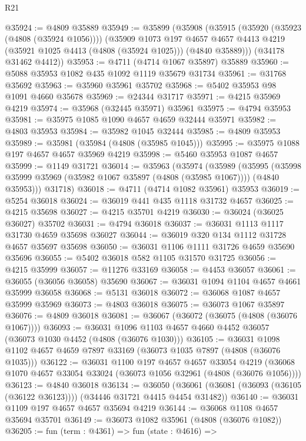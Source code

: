 \begin{lexlean}{R21}
\begin{coremodule}
@35924 := @4809 @35889
@35949 := @35899
    (@35908
      (@35915
        (@35920 (@35923 (@4808 (@35924 @1056))))
        (@35909
          @1073
          @197
          @4657
          @4657
          @4413
          @4219
          (@35921 @1025 @4413 (@4808 (@35924 @1025)))
          (@4840 @35889)))
      (@34178 @31462 @4412))
@35953 := @4711 (@4714 @1067 @35897) @35889
@35960 := @5088 @35953 @1082 @435 @1092 @1119 @35679 @31734
@35961 := @31768 @35692
@35963 := @35960 @35961 @35702
@35968 := @5402 @35953 @98 @1091 @4660 @35678
@35969 := @24344 @31717
@35971 := @4215 @35969 @4219
@35974 := @35968 (@32445 @35971) @35961
@35975 := @4794 @35953
@35981 := @35975 @1085 @1090 @4657 @4659 @32444 @35971
@35982 := @4803 @35953
@35984 := @35982 @1045 @32444
@35985 := @4809 @35953
@35989 := @35981 (@35984 (@4808 (@35985 @1045)))
@35995 := @35975 @1088 @197 @4657 @4657 @35969 @4219
@35998 := @5460 @35953 @1087 @4657
@35999 := @1149 @31721
@36014 := @35963
    (@35974
      (@35989
        (@35995 (@35998 @35999 @35969 (@35982 @1067 @35897 (@4808 (@35985 @1067)))) (@4840 @35953)))
      @31718)
@36018 := @4711 (@4714 @1082 @35961) @35953
@36019 := @5254 @36018
@36024 := @36019 @441 @435 @1118 @31732 @4657
@36025 := @4215 @35698
@36027 := @4215 @35701 @4219
@36030 := @36024 (@36025 @36027) @35702
@36031 := @4794 @36018
@36037 := @36031 @1113 @1117 @31730 @4659 @35698 @36027
@36044 := @36019 @320 @134 @1112 @31728 @4657 @35697 @35698
@36050 := @36031 @1106 @1111 @31726 @4659 @35690 @35696
@36055 := @5402 @36018 @582 @1105 @31570 @31725
@36056 := @4215 @35999
@36057 := @11276 @33169
@36058 := @4453 @36057
@36061 := @36055 (@36056 @36058) @35690
@36067 := @36031 @1094 @1104 @4657 @4661 @35999 @36058
@36068 := @5131 @36018
@36072 := @36068 @1087 @4657 @35999 @35969
@36073 := @4803 @36018
@36075 := @36073 @1067 @35897
@36076 := @4809 @36018
@36081 := @36067 (@36072 (@36075 (@4808 (@36076 @1067))))
@36093 := @36031 @1096 @1103 @4657 @4660 @4452 @36057 (@36073 @1030 @4452 (@4808 (@36076 @1030)))
@36105 := @36031 @1098 @1102 @4657 @4659 @7897 @33169 (@36073 @1035 @7897 (@4808 (@36076 @1035)))
@36122 := @36031
    @1100
    @197
    @4657
    @4657
    @33054
    @4219
    (@36068 @1070 @4657 @33054 @33024 (@36073 @1056 @32961 (@4808 (@36076 @1056))))
@36123 := @4840 @36018
@36134 := @36050
    (@36061 (@36081 (@36093 (@36105 (@36122 @36123)))) (@34446 @31721 @4415 @4454 @31482))
@36140 := @36031 @1109 @197 @4657 @4657 @35694 @4219
@36144 := @36068 @1108 @4657 @35694 @35701
@36149 := @36073 @1082 @35961 (@4808 (@36076 @1082))
@36205 := fun (term : @4361) =>
  fun (state : @4616) =>

\end{coremodule}
\end{lexlean}
